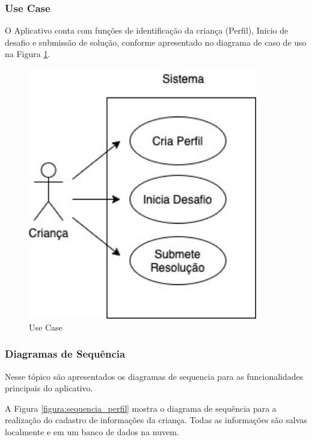         \subsubsection{Use Case}
        O Aplicativo conta com funções de identificação da criança (Perfil), Inicio de desafio e submissão de solução, conforme apresentado no diagrama de caso de uso na Figura \ref{figura:use_case}.
        
        \begin{figure}[H]
            \caption{Use Case}
            \centering
                \includegraphics[width=10cm]{Imagens/cap3/Use Case.jpg}
    
            \label{figura:use_case}
        \end{figure}
        
        \subsubsection{Diagramas de Sequência}
        
        Nesse tópico são apresentados os diagramas de sequencia para as funcionalidades principais do aplicativo.
        
        
        A Figura \ref{figura:sequencia_perfil} mostra o diagrama de sequência para a realização do cadastro de informações da criança. Todas as informações são salvas localmente e em um banco de dados na nuvem.
        
